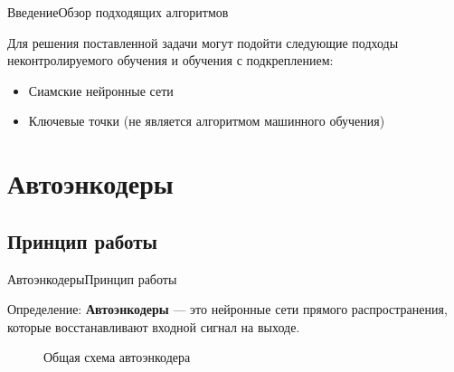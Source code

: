 \documentclass{beamer}
\begin{document}
\begin{frame}{Введение}{Обзор подходящих алгоритмов}

Для решения поставленной задачи могут подойти следующие подходы неконтролируемого обучения и обучения с подкреплением:
\begin{itemize}
	\item Сиамские нейронные сети
	\item Ключевые точки (не является алгоритмом машинного обучения)
\end{itemize}

\end{frame}

\section{Автоэнкодеры}

\subsection{Принцип работы}


\begin{frame}{Автоэнкодеры}{Принцип работы}

\begin{block}{Определение:}
	\textbf{Автоэнкодеры} --- это нейронные сети прямого распространения, которые восстанавливают входной сигнал на выходе.
\end{block}

\begin{figure}[h]
	\caption{Общая схема автоэнкодера}
	\label{fig:ae}
\end{figure}

\end{frame}
\end{document}
